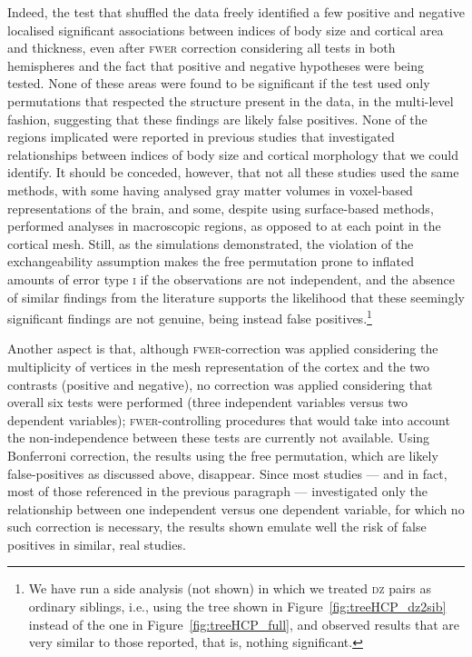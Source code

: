 Indeed, the test that shuffled the data freely identified a few positive and negative localised significant associations between indices of body size and cortical area and thickness, even after \textsc{fwer} correction considering all tests in both hemispheres and the fact that positive and negative hypotheses were being tested. None of these areas were found to be significant if the test used only permutations that respected the structure present in the data, in the multi-level fashion, suggesting that these findings are likely false positives. None of the regions implicated were reported in previous studies that investigated relationships between indices of body size and cortical morphology \citep{Pannacciulli2006, Raji2010, Ho2010, Ho2011, Smucny2012, Curran2013, Marques-Iturria2013, Melka2013, Bond2014} that we could identify. It should be conceded, however, that not all these studies used the same methods, with some having analysed gray matter volumes in voxel-based representations of the brain, and some, despite using surface-based methods, performed analyses in macroscopic regions, as opposed to at each point in the cortical mesh. Still, as the simulations demonstrated, the violation of the exchangeability assumption makes the free permutation prone to inflated amounts of error type \textsc{i} if the observations are not independent, and the absence of similar findings from the literature supports the likelihood that these seemingly significant findings are not genuine, being instead false positives.\footnote{We have run a side analysis (not shown) in which we treated \textsc{dz} pairs as ordinary siblings, i.e., using the tree shown in Figure~\ref{fig:treeHCP_dz2sib} instead of the one in Figure~\ref{fig:treeHCP_full}, and observed results that are very similar to those reported, that is, nothing significant.}

Another aspect is that, although \textsc{fwer}-correction was applied considering the multiplicity of vertices in the mesh representation of the cortex and the two contrasts (positive and negative), no correction was applied considering that overall six tests were performed (three independent variables versus two dependent variables); \textsc{fwer}-controlling procedures that would take into account the non-independence between these tests are currently not available. Using Bonferroni correction, the results using the free permutation, which are likely false-positives as discussed above, disappear. Since most studies --- and in fact, most of those referenced in the previous paragraph --- investigated only the relationship between one independent versus one dependent variable, for which no such correction is necessary, the results shown emulate well the risk of false positives in similar, real studies.

